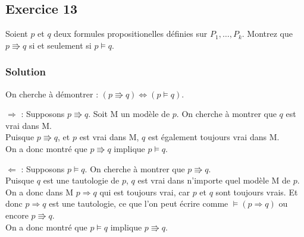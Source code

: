 \subsection*{Exercice 13}
Soient $p$ et $q$ deux formules propositionelles définies sur $P_1, \ldots, P_k$.
Montrez que $p \Rrightarrow q$ si et seulement si $p \models q$. 


\subsubsection*{Solution}

    \noindent On cherche à démontrer : $(p \Rrightarrow q) \Leftrightarrow (p \models q)$.
   
    \noindent $\Rightarrow$ :
    Supposons $p \Rrightarrow q$.
    Soit M un modèle de $p$.
    On cherche à montrer que $q$ est vrai dans M.\\
    Puisque $p \Rrightarrow q$, et $p$ est vrai dans M, $q$ est également toujours vrai dans M.\\
    On a donc montré que $p \Rrightarrow q$ implique $p \models q$.
    
    \noindent $\Leftarrow$ :
    Supposons $p \models q$.
    On cherche à montrer que $p \Rrightarrow q$.\\
    Puisque $q$ est une tautologie de $p$, $q$ est vrai dans n'importe quel modèle M de $p$.
    On a donc dans M $p \Rightarrow q$ qui est toujours vrai, car $p$ et $q$ sont toujours vrais.
    Et donc $p \Rightarrow q$ est une tautologie, ce que l'on peut écrire comme $\models (p \Rightarrow q)$ ou encore $p \Rrightarrow q$.\\
    On a donc montré que $p \models q$ implique $p \Rrightarrow q$.
    
